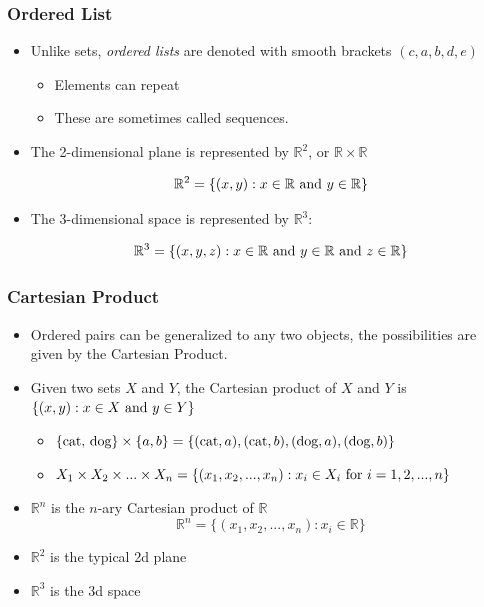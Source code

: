 \documentclass[aspectratio=169, handout]{beamer}
\numberwithin{equation}{section}
\begin{document}
\begin{frame}
\frametitle{Ordered List}

\begin{itemize}
\item  Unlike sets, \textit{ordered lists} are denoted with smooth brackets $(c, a, b, d, e)$ \pause
\begin{itemize}
\item Elements can repeat \pause
\item These are sometimes called sequences.
\end{itemize}
\item The 2-dimensional plane is represented by $\mathbb{R}^2$, or $\mathbb{R}\times \mathbb{R}$

$$\mathbb{R}^2=\{(x, y): x\in \mathbb{R} \hbox{ and }y\in \mathbb{R} \}$$
\item The 3-dimensional space is represented by $\mathbb{R}^3$:

$$\mathbb{R}^3=\{(x, y, z): x\in \mathbb{R} \hbox{ and }y\in \mathbb{R}\hbox{ and } z\in \mathbb{R}  \}$$
\end{itemize}

\end{frame}



\begin{frame}
\frametitle{Cartesian Product}

\begin{itemize}
\item Ordered pairs can be generalized to any two objects, the possibilities are given by the Cartesian Product.

\item Given two sets $X$ and $Y$, the Cartesian product of $X$ and $Y$ is $\{(x, y): x\in X \hbox{ and }y\in Y\}$

\begin{itemize}
\item $\{\hbox{cat, dog}\}\times \{a, b\}= \{(\hbox{cat}, a), (\hbox{cat}, b), (\hbox{dog}, a), (\hbox{dog}, b)\}$ \pause
\item $X_1\times X_2\times ... \times X_n=\{(x_1, x_2, ..., x_n):x_i\in X_i \hbox{ for }i=1, 2, ..., n\}$ \pause
\end{itemize}
\end{itemize}

\begin{itemize}
\item $\mathbb{R}^n$ is the $n$-ary Cartesian product of $\mathbb{R}$
$$\mathbb{R}^n=\{(x_1, x_2, ..., x_n): x_i\in \mathbb{R} \}$$
\item $\mathbb{R}^2$ is the typical 2d plane
\item $\mathbb{R}^3$ is the 3d space
\end{itemize}

\end{frame}
\end{document}
